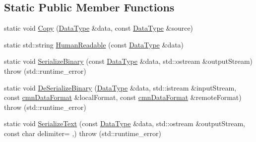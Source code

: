 \subsection*{Static Public Member Functions}
\begin{DoxyCompactItemize}
\item 
static void \hyperlink{classcmn_data_3_01vct_fixed_size_matrix_3_01__element_type_00_01__rows_00_01__cols_00_01__row_major_01_4_01_4_a33f6aa12c25b4ba0be14f6ae06567f13}{Copy} (\hyperlink{classcmn_data_3_01vct_fixed_size_matrix_3_01__element_type_00_01__rows_00_01__cols_00_01__row_major_01_4_01_4_a6b06110fd1bb7049b72ce21275dd8aee}{Data\+Type} \&data, const \hyperlink{classcmn_data_3_01vct_fixed_size_matrix_3_01__element_type_00_01__rows_00_01__cols_00_01__row_major_01_4_01_4_a6b06110fd1bb7049b72ce21275dd8aee}{Data\+Type} \&source)
\item 
static std\+::string \hyperlink{classcmn_data_3_01vct_fixed_size_matrix_3_01__element_type_00_01__rows_00_01__cols_00_01__row_major_01_4_01_4_a48634a092c1b2434183bb2ee90f3e845}{Human\+Readable} (const \hyperlink{classcmn_data_3_01vct_fixed_size_matrix_3_01__element_type_00_01__rows_00_01__cols_00_01__row_major_01_4_01_4_a6b06110fd1bb7049b72ce21275dd8aee}{Data\+Type} \&data)
\item 
static void \hyperlink{classcmn_data_3_01vct_fixed_size_matrix_3_01__element_type_00_01__rows_00_01__cols_00_01__row_major_01_4_01_4_a1d823ba1a8c10099cbd46bdbff1ad013}{Serialize\+Binary} (const \hyperlink{classcmn_data_3_01vct_fixed_size_matrix_3_01__element_type_00_01__rows_00_01__cols_00_01__row_major_01_4_01_4_a6b06110fd1bb7049b72ce21275dd8aee}{Data\+Type} \&data, std\+::ostream \&output\+Stream)  throw (std\+::runtime\+\_\+error)
\item 
static void \hyperlink{classcmn_data_3_01vct_fixed_size_matrix_3_01__element_type_00_01__rows_00_01__cols_00_01__row_major_01_4_01_4_a0f24993fe2d0776eae9957029c22ed6e}{De\+Serialize\+Binary} (\hyperlink{classcmn_data_3_01vct_fixed_size_matrix_3_01__element_type_00_01__rows_00_01__cols_00_01__row_major_01_4_01_4_a6b06110fd1bb7049b72ce21275dd8aee}{Data\+Type} \&data, std\+::istream \&input\+Stream, const \hyperlink{classcmn_data_format}{cmn\+Data\+Format} \&local\+Format, const \hyperlink{classcmn_data_format}{cmn\+Data\+Format} \&remote\+Format)  throw (std\+::runtime\+\_\+error)
\item 
static void \hyperlink{classcmn_data_3_01vct_fixed_size_matrix_3_01__element_type_00_01__rows_00_01__cols_00_01__row_major_01_4_01_4_a32663c3d502d7d103f1b0d17564b13e0}{Serialize\+Text} (const \hyperlink{classcmn_data_3_01vct_fixed_size_matrix_3_01__element_type_00_01__rows_00_01__cols_00_01__row_major_01_4_01_4_a6b06110fd1bb7049b72ce21275dd8aee}{Data\+Type} \&data, std\+::ostream \&output\+Stream, const char delimiter= \textquotesingle{},\textquotesingle{})  throw (std\+::runtime\+\_\+error)

\end{DoxyCompactItemize}
